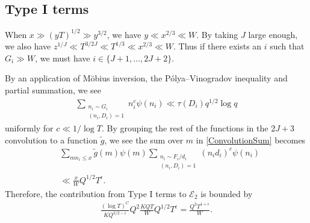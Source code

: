 \documentclass[oneside, 12pt]{amsart}
\theoremstyle{definition}
\begin{document}
 \subsection{Type I terms} When $x\gg (yT)^{1/2}\gg y^{3/2}$, we have $ y\ll x^{2/3}\ll W$. By taking $J$ large enough, we also have $z^{1/J} \ll T^{3/2J}\ll T^{1/3}\ll x^{2/3}\ll W$. Thus if there exists an $i$ such that $G_i\gg W$, we must have $i\in \{ J+1, \dots, 2J+2\}$. 
 
By an application of M\"obius inversion, the P\'olya--Vinogradov inequality and partial summation, we see 
\begin{align*}
\sum_{\substack{n_i\sim G_i\\ (n_i, D_i)=1}}n_i^c\psi(n_i)\ll \tau(D_i)q^{1/2}\log q
\end{align*}
uniformly for $c\ll 1/\log T$. 
By grouping the rest of the functions in the $2J+3$ convolution to a function $\tilde{g}$, we see the sum over $m$ in \eqref{ConvolutionSum} becomes
\begin{align*}
&\sum_{mn_i\leq x}\tilde{g}(m)\psi(m) \sum_{\substack{n_i\sim F_i/d_i\\ (n_i, D_i)=1}}(n_id_i)^{c}\psi(n_i)\\
& \ll \frac{x}{W}Q^{1/2}T^\epsilon.
\end{align*}
Therefore, the contribution from Type I terms to $\mathcal{E}_2$ is bounded by 
\begin{align}\label{Type1Error}
\frac{(\log T)^C}{KQ^{3/2-\epsilon}}Q^2 \frac{KQT}{W}Q^{1/2}T^\epsilon= \frac{Q^2T^{1+\epsilon}}{W}.
\end{align}
\end{document}

